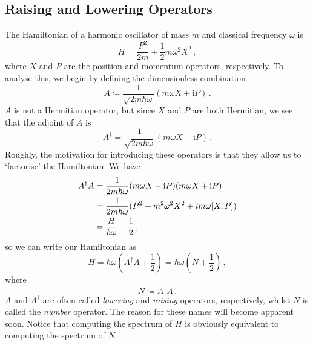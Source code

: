 \documentclass{article}
\theoremstyle{plain}\theoremheaderfont{\normalfont\itshape}\theorembodyfont{\rmfamily}\theoremseparator{.}\newtheorem*{rem}{Remark}\newtheorem*{ex}{Example}\newtheorem*{proof}{Proof}\newtheorem*{altp}{Alternative proof}
\theoremstyle{plain}\theoremheaderfont{\normalfont\bfseries}\theorembodyfont{\rmfamily}\theoremseparator{.}\newtheorem{thm}{Theorem}[section]\newtheorem{lem}[thm]{Lemma}\newtheorem{prop}[thm]{Proposition}\newtheorem*{cor}{Corollary}\newtheorem{defn}[thm]{Definition}\newtheorem{clm}[thm]{Claim}\newtheorem{clminproof}{Claim}
\theoremstyle{break}\theoremheaderfont{\normalfont\itshape}\theorembodyfont{\rmfamily}\theoremseparator{.\medskip}\newtheorem*{proofskip}{Proof}\newtheorem*{exs}{Examples}\newtheorem*{rems}{Remarks}
\theoremstyle{break}\theoremheaderfont{\normalfont\bfseries}\theorembodyfont{\rmfamily}\theoremseparator{.\medskip}\newtheorem{lemskip}[thm]{Lemma}\newtheorem{defnskip}[thm]{Definition}\newtheorem{propskip}[thm]{Proposition}\newtheorem{thmskip}[thm]{Theorem}
\numberwithin{equation}{section}
\newcommand{\ii}{\mathrm{i}}
\begin{document}
    \subsection{Raising and Lowering Operators}
    The Hamiltonian of a harmonic oscillator of mass \(m\) and classical frequency \(\omega\) is
    \begin{equation}
        H=\frac{P^2}{2m}+\frac{1}{2}m\omega^2X^2\,,
    \end{equation}
    where \(X\) and \(P\) are the position and momentum operators, respectively. To analyse this, we begin by defining the dimensionless combination
    \begin{equation}
        A\coloneqq\frac{1}{\sqrt{2m\hbar\omega}}(m\omega X+\ii P)\,.
    \end{equation}
    \(A\) is not a Hermitian operator, but since \(X\) and \(P\) are both Hermitian, we see that the adjoint of \(A\) is
    \begin{equation}
        A^\dagger=\frac{1}{\sqrt{2m\hbar\omega}}(m\omega X-\ii P)\,.
    \end{equation}
    Roughly, the motivation for introducing these operators is that they allow us to `factorise' the Hamiltonian. We have
    \begin{align}
        A^\dagger A&=\frac{1}{2m\hbar\omega}(m\omega X-\ii P)(m\omega X+\ii P)\notag\\
        &=\frac{1}{2m\hbar\omega}(P^2+m^2\omega^2X^2+im\omega[X,P])\notag\\
        &=\frac{H}{\hbar\omega}-\frac{1}{2}\,,
    \end{align}
    so we can write our Hamiltonian as
    \begin{equation}
        H=\hbar\omega\left(A^\dagger A+\frac{1}{2}\right)=\hbar\omega\left(N+\frac{1}{2}\right)\,,
    \end{equation}
    where
    \begin{equation}
        N\coloneqq A^\dagger A\,.
    \end{equation}
    \(A\) and \(A^\dagger\) are often called \textit{lowering} and \textit{raising} operators, respectively, whilst \(N\) is called the \textit{number} operator. The reason for these names will become apparent soon. Notice that computing the spectrum of \(H\) is obviously equivalent to computing the spectrum of \(N\).
\end{document}
